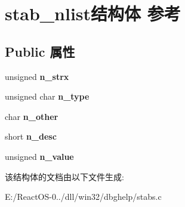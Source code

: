 \hypertarget{structstab__nlist}{}\section{stab\+\_\+nlist结构体 参考}
\label{structstab__nlist}
\subsection*{Public 属性}
\begin{DoxyCompactItemize}
\item 
\mbox{\label{structstab__nlist_a86137cb9d325797ccd5633859a9e2e98}} 
unsigned {\bfseries n\+\_\+strx}
\item 
\mbox{\label{structstab__nlist_ab7efefc10614c4156566db5506d42b53}} 
unsigned char {\bfseries n\+\_\+type}
\item 
\mbox{\label{structstab__nlist_a689fb64a1e6433cdffde3c7b7c65f7f6}} 
char {\bfseries n\+\_\+other}
\item 
\mbox{\label{structstab__nlist_a74b0065396905e61d91257f9db4ce66c}} 
short {\bfseries n\+\_\+desc}
\item 
\mbox{\label{structstab__nlist_ac041e940e73fafb573f51b3f9df89198}} 
unsigned {\bfseries n\+\_\+value}
\end{DoxyCompactItemize}


该结构体的文档由以下文件生成\+:\begin{DoxyCompactItemize}
\item 
E\+:/\+React\+O\+S-\/0../dll/win32/dbghelp/stabs.\+c\end{DoxyCompactItemize}
